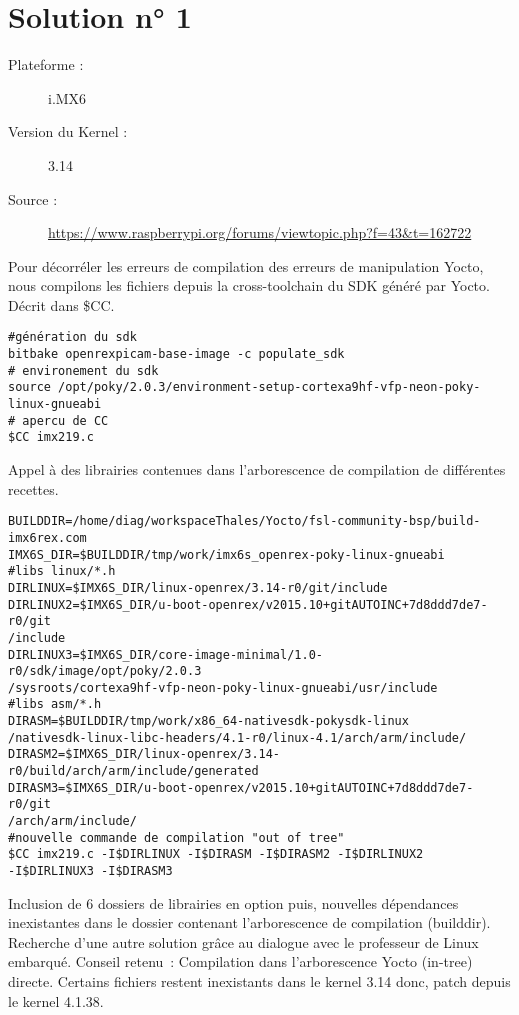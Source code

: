 \chapter{Solution n° 1} %
\label{Chapter2} %

\begin{description}
  \item[Plateforme :] i.MX6
  \item[Version du Kernel :] 3.14
  \item[Source :] \href{https://www.raspberrypi.org/forums/viewtopic.php?f=43&t=162722}
  {https://www.raspberrypi.org/forums/viewtopic.php?f=43\&t=162722}
\end{description}

Pour décorréler les erreurs de compilation des erreurs de manipulation Yocto,
nous  compilons les fichiers depuis la cross-toolchain du SDK généré par Yocto.
Décrit dans \$CC.

\begin{lstlisting}
#génération du sdk
bitbake openrexpicam-base-image -c populate_sdk
# environement du sdk
source /opt/poky/2.0.3/environment-setup-cortexa9hf-vfp-neon-poky-linux-gnueabi
# apercu de CC
$CC imx219.c
\end{lstlisting}

Appel à des librairies contenues dans l’arborescence de compilation de
différentes recettes.

\begin{lstlisting}
BUILDDIR=/home/diag/workspaceThales/Yocto/fsl-community-bsp/build-imx6rex.com
IMX6S_DIR=$BUILDDIR/tmp/work/imx6s_openrex-poky-linux-gnueabi
#libs linux/*.h
DIRLINUX=$IMX6S_DIR/linux-openrex/3.14-r0/git/include
DIRLINUX2=$IMX6S_DIR/u-boot-openrex/v2015.10+gitAUTOINC+7d8ddd7de7-r0/git
/include
DIRLINUX3=$IMX6S_DIR/core-image-minimal/1.0-r0/sdk/image/opt/poky/2.0.3
/sysroots/cortexa9hf-vfp-neon-poky-linux-gnueabi/usr/include
#libs asm/*.h
DIRASM=$BUILDDIR/tmp/work/x86_64-nativesdk-pokysdk-linux
/nativesdk-linux-libc-headers/4.1-r0/linux-4.1/arch/arm/include/
DIRASM2=$IMX6S_DIR/linux-openrex/3.14-r0/build/arch/arm/include/generated
DIRASM3=$IMX6S_DIR/u-boot-openrex/v2015.10+gitAUTOINC+7d8ddd7de7-r0/git
/arch/arm/include/
#nouvelle commande de compilation "out of tree"
$CC imx219.c -I$DIRLINUX -I$DIRASM -I$DIRASM2 -I$DIRLINUX2
-I$DIRLINUX3 -I$DIRASM3
\end{lstlisting}

Inclusion de 6 dossiers de librairies en option puis, nouvelles dépendances
inexistantes dans le dossier contenant l’arborescence de compilation (builddir).
Recherche d’une autre solution grâce au dialogue avec le professeur de Linux
embarqué. Conseil retenu : Compilation dans l’arborescence Yocto (in-tree)
directe. Certains fichiers restent inexistants dans le kernel 3.14 donc,
patch depuis le kernel 4.1.38.
